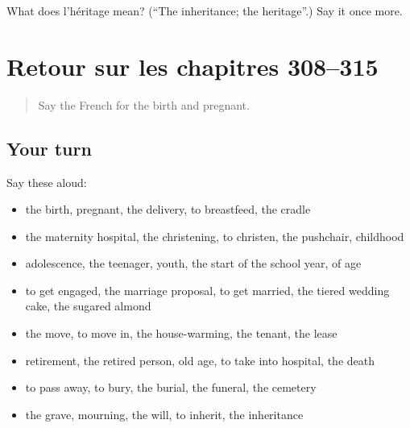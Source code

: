 \begin{tcolorbox}[breakable,colback=teal!4,colframe=teal!35!black,title={Before you move on}]
What does l'héritage mean? (\textquotedblleft{}The inheritance; the heritage\textquotedblright{}.) Say it once more.
\end{tcolorbox}
\section[(dialogue)]{Retour sur les chapitres 308–315}

\label{lesson:FR-R315-revision-308-315}



\begin{quote}
Say the French for the birth and pregnant.
\end{quote}

\subsection*{Your turn}
Say these aloud:

\begin{itemize}
\raggedright
  \item the birth, pregnant, the delivery, to breastfeed, the cradle
  \item the maternity hospital, the christening, to christen, the pushchair, childhood
  \item adolescence, the teenager, youth, the start of the school year, of age
  \item to get engaged, the marriage proposal, to get married, the tiered wedding cake, the sugared almond
  \item the move, to move in, the house-warming, the tenant, the lease
  \item retirement, the retired person, old age, to take into hospital, the death
  \item to pass away, to bury, the burial, the funeral, the cemetery
  \item the grave, mourning, the will, to inherit, the inheritance
\end{itemize}


